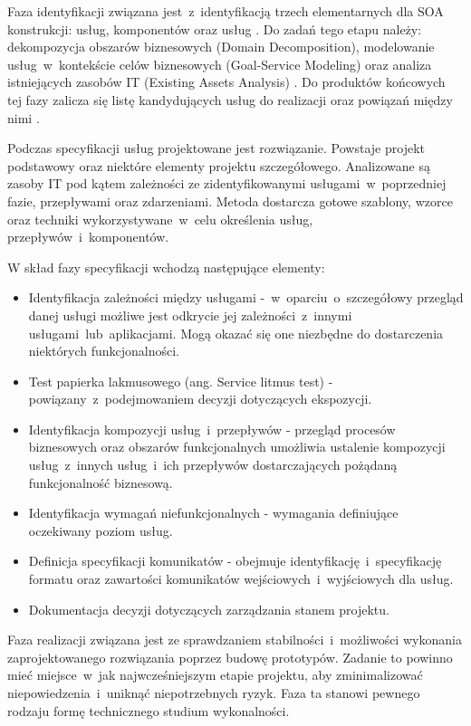 Faza identyfikacji związana jest~z~identyfikacją trzech elementarnych dla SOA konstrukcji: usług, komponentów oraz usług  \cite{PlatIntGor}. Do zadań tego etapu należy: dekompozycja obszarów biznesowych (Domain Decomposition), modelowanie usług~w~kontekście celów biznesowych (Goal-Service Modeling) oraz analiza istniejących zasobów IT (Existing Assets Analysis) \cite{SOMAibmRosSuda}. Do produktów końcowych tej fazy zalicza się listę kandydujących usług do realizacji oraz powiązań między nimi \cite{PlatIntGor}.

Podczas specyfikacji usług projektowane jest rozwiązanie. Powstaje projekt podstawowy oraz niektóre elementy projektu szczegółowego. Analizowane są zasoby IT pod kątem zależności ze zidentyfikowanymi usługami~w~poprzedniej fazie, przepływami oraz zdarzeniami. Metoda dostarcza gotowe szablony, wzorce oraz techniki wykorzystywane~w~celu określenia usług, przepływów~i~komponentów. 

W skład fazy specyfikacji wchodzą następujące elementy:
\begin{itemize}
\item{Identyfikacja zależności między usługami -~w~oparciu~o~szczegółowy przegląd danej usługi możliwe jest odkrycie jej zależności~z~innymi usługami~lub~aplikacjami. Mogą okazać się one niezbędne do dostarczenia niektórych funkcjonalności.}
\item{Test papierka lakmusowego (ang. Service litmus test) - powiązany~z~podejmowaniem decyzji dotyczących ekspozycji.}
\item{Identyfikacja kompozycji usług~i~przepływów - przegląd procesów biznesowych oraz obszarów funkcjonalnych umożliwia ustalenie kompozycji usług~z~innych usług~i~ich przepływów dostarczających pożądaną funkcjonalność biznesową.}
\item{Identyfikacja wymagań niefunkcjonalnych - wymagania definiujące oczekiwany poziom usług.}
\item{Definicja specyfikacji komunikatów - obejmuje identyfikację~i~specyfikację formatu oraz zawartości komunikatów wejściowych~i~wyjściowych dla usług.}
\item{Dokumentacja decyzji dotyczących zarządzania stanem projektu.}
\end{itemize}

Faza realizacji związana jest ze sprawdzaniem stabilności~i~możliwości wykonania zaprojektowanego rozwiązania poprzez budowę prototypów. Zadanie to powinno mieć miejsce~w~jak najwcześniejszym etapie projektu, aby zminimalizować niepowiedzenia~i~uniknąć niepotrzebnych ryzyk. Faza ta stanowi pewnego rodzaju formę technicznego studium wykonalności. 

